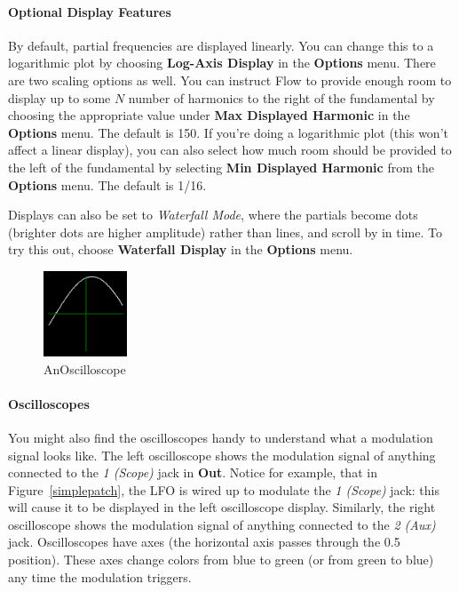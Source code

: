 \documentclass{article}
\begin{document}
\paragraph{Optional Display Features}
By default, partial frequencies are displayed linearly.  You can change this to a logarithmic plot by choosing {\bf Log-Axis Display} in the {\bf Options} menu.  There are two scaling options as well.  You can instruct Flow to provide enough room to display up to some \(N\) number of harmonics to the right of the fundamental by choosing the appropriate value under {\bf Max Displayed Harmonic} in the {\bf Options} menu.  The default is 150. If you're doing a logarithmic plot (this won't affect a linear display), you can also select how much room should be provided to the left of the fundamental by selecting {\bf Min Displayed Harmonic} from the {\bf Options} menu.  The default is 1/16.

Displays can also be set to {\it Waterfall Mode}, where the partials become dots (brighter dots are higher amplitude) rather than lines, and scroll by in time.  To try this out, choose {\bf Waterfall Display} in the {\bf Options} menu.

\begin{figure}
\vspace{-1em}
\includegraphics[height=1in]{oscilloscope}
\caption{An\newline Oscilloscope}
\vspace{-2em}
\label{oscilloscope}
\end{figure}

\paragraph{Oscilloscopes}
You might also find the oscilloscopes handy to understand what a modulation signal looks like.  The left oscilloscope shows the modulation signal of anything connected to the {\it 1 (Scope)} jack in {\bf Out}.  Notice for example, that in Figure~\ref{simplepatch}, the LFO is wired up to modulate the {\it 1 (Scope)} jack: this will cause it to be displayed in the left oscilloscope display.  Similarly, the right oscilloscope shows the modulation signal of anything connected to the {\it 2 (Aux)} jack.  Oscilloscopes have axes (the horizontal axis passes through the 0.5 position).  These axes change colors from blue to green (or from green to blue) any time the modulation triggers.
\end{document}
